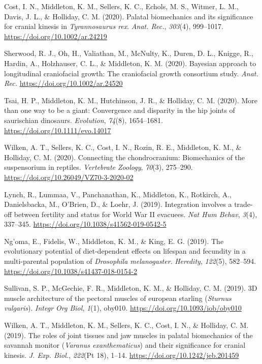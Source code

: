 \documentclass[11pt, a4paper]{awesome-cv}
\begin{document}
\leavevmode\hypertarget{ref-Cost2020-jo}{}%
Cost, I. N., Middleton, K. M., Sellers, K. C., Echols, M. S., Witmer, L.
M., Davis, J. L., \& Holliday, C. M. (2020). Palatal biomechanics and
its significance for cranial kinesis in \emph{Tyrannosaurus rex}.
\emph{Anat. Rec.}, \emph{303}(4), 999--1017.
\url{https://doi.org/10.1002/ar.24219}

\leavevmode\hypertarget{ref-Sherwood2020-le}{}%
Sherwood, R. J., Oh, H., Valiathan, M., McNulty, K., Duren, D. L.,
Knigge, R., Hardin, A., Holzhauser, C. L., \& Middleton, K. M. (2020).
Bayesian approach to longitudinal craniofacial growth: The craniofacial
growth consortium study. \emph{Anat. Rec.}
\url{https://doi.org/10.1002/ar.24520}

\leavevmode\hypertarget{ref-Tsai2020-zm}{}%
Tsai, H. P., Middleton, K. M., Hutchinson, J. R., \& Holliday, C. M.
(2020). More than one way to be a giant: Convergence and disparity in
the hip joints of saurischian dinosaurs. \emph{Evolution}, \emph{74}(8),
1654--1681. \url{https://doi.org/10.1111/evo.14017}

\leavevmode\hypertarget{ref-Wilken2020-wf}{}%
Wilken, A. T., Sellers, K. C., Cost, I. N., Rozin, R. E., Middleton, K.
M., \& Holliday, C. M. (2020). Connecting the chondrocranium:
Biomechanics of the suspensorium in reptiles. \emph{Vertebrate Zoology},
\emph{70}(3), 275--290. \url{https://doi.org/10.26049/VZ70-3-2020-02}

\leavevmode\hypertarget{ref-Lynch2019-ny}{}%
Lynch, R., Lummaa, V., Panchanathan, K., Middleton, K., Rotkirch, A.,
Danielsbacka, M., O'Brien, D., \& Loehr, J. (2019). Integration involves
a trade-off between fertility and status for World War II evacuees.
\emph{Nat Hum Behav}, \emph{3}(4), 337--345.
\url{https://doi.org/10.1038/s41562-019-0542-5}

\leavevmode\hypertarget{ref-Ngoma2019-gq}{}%
Ng'oma, E., Fidelis, W., Middleton, K. M., \& King, E. G. (2019). The
evolutionary potential of diet-dependent effects on lifespan and
fecundity in a multi-parental population of \emph{Drosophila
melanogaster}. \emph{Heredity}, \emph{122}(5), 582--594.
\url{https://doi.org/10.1038/s41437-018-0154-2}

\leavevmode\hypertarget{ref-Sullivan2019-vq}{}%
Sullivan, S. P., McGechie, F. R., Middleton, K. M., \& Holliday, C. M.
(2019). 3D muscle architecture of the pectoral muscles of european
starling (\emph{Sturnus vulgaris}). \emph{Integr Org Biol}, \emph{1}(1),
oby010. \url{https://doi.org/10.1093/iob/oby010}

\leavevmode\hypertarget{ref-Wilken2019-so}{}%
Wilken, A. T., Middleton, K. M., Sellers, K. C., Cost, I. N., \&
Holliday, C. M. (2019). The roles of joint tissues and jaw muscles in
palatal biomechanics of the savannah monitor (\emph{Varanus
exanthematicus}) and their significance for cranial kinesis. \emph{J.
Exp. Biol.}, \emph{222}(Pt 18), 1--14.
\url{https://doi.org/10.1242/jeb.201459}
\end{document}
